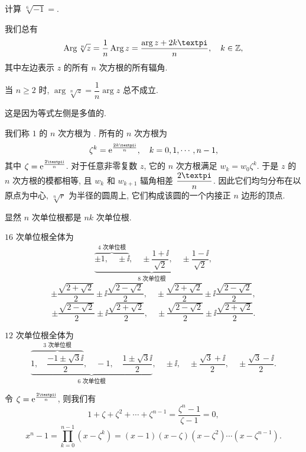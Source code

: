 \begin{exercise}
  计算 $\sqrt[6]{-1}=$\fillblank{}.
\end{exercise}

我们总有
\begin{equation}
  \label{eq:Arg-root-equality}
  \Arg \sqrt[n]z=\frac1n\Arg z=\frac{\arg z+2k\cpi}n,\quad k\in\BZ,
\end{equation}
其中左边表示 $z$ 的所有 $n$ 次方根的所有辐角.
\begin{marker}
  当 $n\ge 2$ 时, $\arg \sqrt[n]z=\dfrac 1n\arg z$ 总不成立.
\end{marker}
这是因为等式左侧是多值的.

我们称 $1$ 的 $n$ 次方根为 .
所有的 $n$ 次方根为
\[
  \zeta^k=\ee^{\frac{2k\cpi \ii}n},\quad k=0,1,\cdots,n-1,
\]
其中 $\zeta=\ee^{\frac{2\cpi \ii}n}$.
对于任意非零复数 $z$, 它的 $n$ 次方根满足 $w_k=w_0\zeta^k$.
于是 $z$ 的 $n$ 次方根的模都相等, 且 $w_k$ 和 $w_{k+1}$ 辐角相差 $\dfrac{2\cpi}n$.
因此\alert{它们均匀分布在以原点为中心, $\sqrt[n]r$ 为半径的圆周上}, 它们构成该圆的一个内接正 $n$ 边形的顶点.

\begin{example}
  显然 $n$ 次单位根都是 $nk$ 次单位根.
  \begin{enumr}
    \item $16$ 次单位根全体为
    \[
      \underbrace{
        \overbrace{
          \pm1,\quad
          \pm \ii
        }^{\text{$4$ 次单位根}},\quad
        \pm\frac{1+\ii}{\sqrt2},\quad
        \pm\frac{1-\ii}{\sqrt2}
      }_{\text{$8$ 次单位根}},
    \]
    \[
      \pm\frac{\sqrt{2+\sqrt2}}2\pm\ii\frac{\sqrt{2-\sqrt2}}2,\quad
      \pm\frac{\sqrt{2+\sqrt2}}2\pm\ii\frac{\sqrt{2-\sqrt2}}2,
    \]
    \[
      \pm\frac{\sqrt{2-\sqrt2}}2\pm\ii\frac{\sqrt{2+\sqrt2}}2,\quad
      \pm\frac{\sqrt{2-\sqrt2}}2\pm\ii\frac{\sqrt{2+\sqrt2}}2.
    \]
    \vspace{-\baselineskip}
    \item $12$ 次单位根全体为
    \[
      \underbrace{
        \overbrace{
          1,\quad
          \frac{-1\pm\sqrt3\ii}2
        }^{\text{$3$ 次单位根}},\quad
        -1,\quad
        \frac{1\pm\sqrt3\ii}2
      }_{\text{$6$ 次单位根}},\quad
      \pm\ii,\quad
      \pm\frac{\sqrt 3+\ii}2,\quad
      \pm\frac{\sqrt 3-\ii}2.
    \]
    \vspace{-\baselineskip}
    \item 令 $\zeta=\ee^{\frac{2\cpi \ii}n}$, 则我们有
    \[
      1+\zeta+\zeta^2+\cdots+\zeta^{n-1}
      =\frac{\zeta^n-1}{\zeta-1}=0,
    \]
    \[
        x^n-1
      =\prod_{k=0}^{n-1}(x-\zeta^k)
      =(x-1)(x-\zeta)(x-\zeta^2)\cdots(x-\zeta^{n-1}).
    \]
  \end{enumr}
\end{example}


